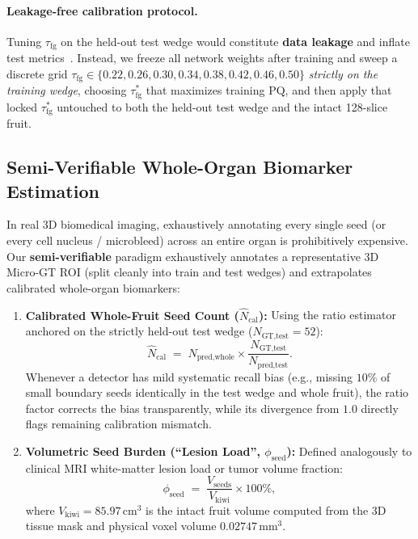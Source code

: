 \documentclass[10pt,a4paper]{article}
\renewcommand{\_}{\origunderscore\allowbreak}
\begin{document}
\paragraph{Leakage-free calibration protocol.} Tuning $\tau_{\text{fg}}$ on the held-out test wedge would constitute \textbf{data leakage} and inflate test metrics~\cite{collins2024tripodai}. Instead, we freeze all network weights after training and sweep a discrete grid $\tau_{\text{fg}} \in \{0.22, 0.26, 0.30, 0.34, 0.38, 0.42, 0.46, 0.50\}$ \emph{strictly on the training wedge}, choosing $\tau_{\text{fg}}^*$ that maximizes training $\text{PQ}$, and then apply that locked $\tau_{\text{fg}}^*$ untouched to both the held-out test wedge and the intact 128-slice fruit.

\subsection{Semi-Verifiable Whole-Organ Biomarker Estimation}

In real 3D biomedical imaging, exhaustively annotating every single seed (or every cell nucleus / microbleed) across an entire organ is prohibitively expensive. Our \textbf{semi-verifiable} paradigm exhaustively annotates a representative 3D Micro-GT ROI (split cleanly into train and test wedges) and extrapolates calibrated whole-organ biomarkers:
\begin{enumerate}
    \item \textbf{Calibrated Whole-Fruit Seed Count ($\hat{N}_{\text{cal}}$):} Using the ratio estimator anchored on the strictly held-out test wedge ($N_{\text{GT,test}} = 52$):
    \begin{equation}
        \hat{N}_{\text{cal}} \;=\; N_{\text{pred,whole}} \times \frac{N_{\text{GT,test}}}{N_{\text{pred,test}}}.
        \label{eq:ratio_est}
    \end{equation}
    Whenever a detector has mild systematic recall bias (e.g., missing $10\%$ of small boundary seeds identically in the test wedge and whole fruit), the ratio factor corrects the bias transparently, while its divergence from $1.0$ directly flags remaining calibration mismatch.
    \item \textbf{Volumetric Seed Burden (``Lesion Load'', $\phi_{\text{seed}}$):} Defined analogously to clinical MRI white-matter lesion load or tumor volume fraction:
    \begin{equation}
        \phi_{\text{seed}} \;=\; \frac{V_{\text{seeds}}}{V_{\text{kiwi}}} \times 100\%,
        \label{eq:lesion_load}
    \end{equation}
    where $V_{\text{kiwi}} = 85.97\,\text{cm}^3$ is the intact fruit volume computed from the 3D tissue mask and physical voxel volume $0.02747\,\text{mm}^3$.
\end{enumerate}
\end{document}
